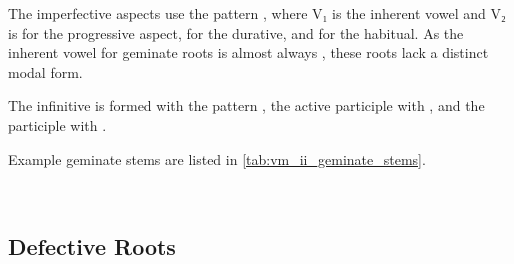 \documentclass[grammar]{subfiles}
\begin{document}
The imperfective aspects use the pattern , where V₁ is the
inherent vowel and V₂ is  for the progressive aspect,  for the
durative, and  for the habitual. As the inherent vowel for geminate
roots is almost always , these roots lack a distinct modal form.

The infinitive is formed with the pattern , the active participle
with , and the participle with .  

Example geminate stems are listed in \cref{tab:vm_ii_geminate_stems}.

\begin{table}[h!]\small\capstart
  \centering
  \\
  \caption{Pattern II geminate stems \label{tab:vm_ii_geminate_stems}}
\end{table}


\subsection{Defective Roots}
\label{ssec:vm_ii_defective_roots}
\end{document}
